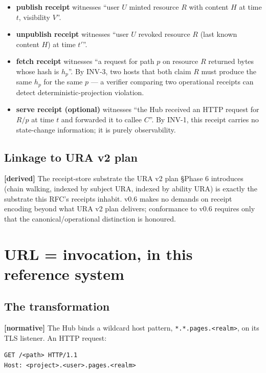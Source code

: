 \documentclass[11pt,a4paper]{article}
\newcommand{\normsv}{\textcolor{normativecolor}{\textbf{[normative]}}\xspace}
\newcommand{\derived}{\textcolor{derivedcolor}{\textbf{[derived]}}\xspace}
\theoremstyle{definition}
\begin{document}
\begin{itemize}[leftmargin=2em,itemsep=0.18em]
    \item \textbf{publish receipt} witnesses ``user \(U\)
    minted resource \(R\) with content \(H\) at time \(t\),
    visibility \(V\)''.
    \item \textbf{unpublish receipt} witnesses ``user \(U\)
    revoked resource \(R\) (last known content \(H\)) at time
    \(t'\)''.
    \item \textbf{fetch receipt} witnesses ``a request for
    path \(p\) on resource \(R\) returned bytes whose hash is
    \(h_p\)''. By INV-3, two hosts that both claim \(R\) must
    produce the same \(h_p\) for the same \(p\) --- a
    verifier comparing two operational receipts can detect
    deterministic-projection violation.
    \item \textbf{serve receipt (optional)} witnesses ``the
    Hub received an HTTP request for \(R/p\) at time \(t\)
    and forwarded it to callee \(C\)''. By INV-1, this receipt
    carries no state-change information; it is purely
    observability.
\end{itemize}

\subsection{Linkage to URA v2 plan}

\derived{} The receipt-store substrate the URA v2 plan §Phase 6
introduces (chain walking, indexed by subject URA, indexed by
ability URA) is exactly the substrate this RFC's receipts
inhabit. v0.6 makes no demands on receipt encoding beyond what
URA v2 plan delivers; conformance to v0.6 requires only that
the canonical/operational distinction is honoured.

\section{URL = invocation, in this reference system}
\label{sec:url}

\subsection{The transformation}

\normsv{} The Hub binds a wildcard host pattern,
\texttt{*.*.pages.<realm>}, on its TLS listener. An HTTP
request:

\begin{lstlisting}
GET /<path> HTTP/1.1
Host: <project>.<user>.pages.<realm>
\end{lstlisting}
\end{document}
